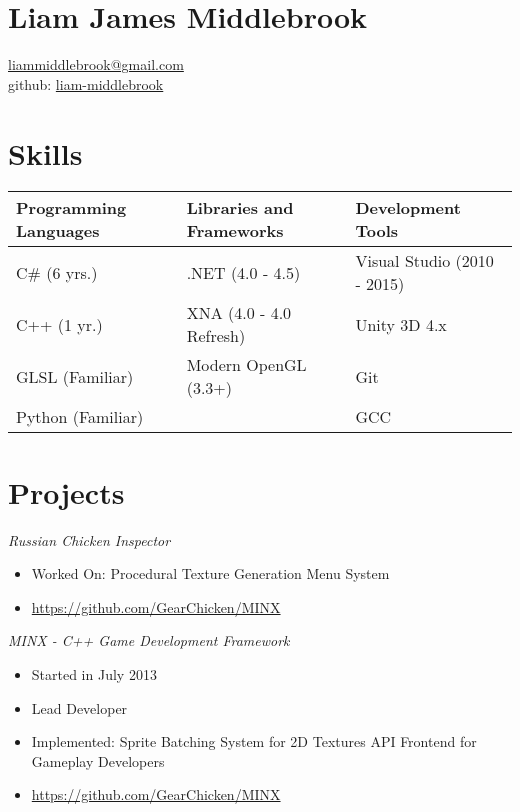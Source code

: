 \documentclass[line,margin]{res}
\begin{document}
\marginsize{.5in}{.5in}{1.0in}{.5in}

\section{Liam James Middlebrook}

\href{mailto:liammiddlebrook@gmail.com}{liammiddlebrook@gmail.com}\\
github: \href{https://github.com/liam-middlebrook}{liam-middlebrook}

\begin{resume}


\section{Skills}
\begin{table}[h]
\begin{tabular}{@{}lll@{}}
\toprule
Programming Languages & Libraries and Frameworks & Development Tools           \\ \midrule
C\# (6 yrs.)          & .NET (4.0 - 4.5)         & Visual Studio (2010 - 2015) \\
C++ (1 yr.)           & XNA (4.0 - 4.0 Refresh)  & Unity 3D 4.x                \\
GLSL (Familiar)       & Modern OpenGL (3.3+)     & Git                         \\
Python (Familiar)     &                          & GCC                         \\ \bottomrule
\end{tabular}
\end{table}
\section{Projects}


{\sl Russian Chicken
Inspector}
\begin{itemize}
\itemsep1pt\parskip0pt
\item
Worked On:
\subitem
Procedural Texture Generation
\subitem
Menu System
\item
\url {https://github.com/GearChicken/MINX}
\end{itemize}

{\sl MINX - C++ Game Development
Framework}
\begin{itemize}
\itemsep1pt\parskip0pt
\item
Started in July 2013
\item Lead Developer
\item Implemented:
\subitem Sprite Batching System for 2D Textures
\subitem API Frontend for Gameplay Developers
\item
\url{https://github.com/GearChicken/MINX}
\end{itemize}


\end{resume}
\end{document}
